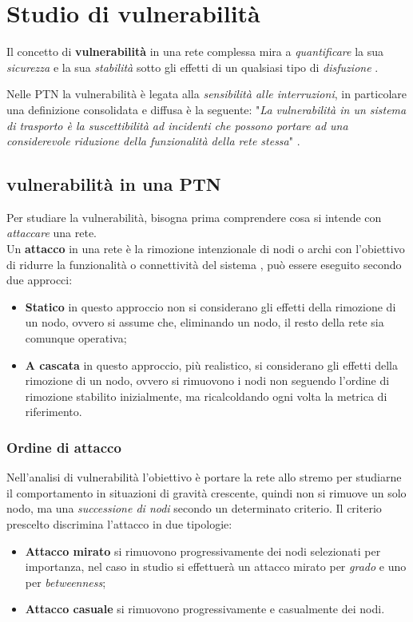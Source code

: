 \chapter{Studio di vulnerabilità}
\label{cap5}

Il concetto di \textbf{vulnerabilità} in una rete complessa mira a \textit{quantificare} la sua \textit{sicurezza} e la sua \textit{stabilità} sotto gli effetti di un qualsiasi tipo di \textit{disfuzione} \cite{MattssonJenelius2015}.

Nelle PTN la vulnerabilità è legata alla \textit{sensibilità alle interruzioni}, in particolare una definizione consolidata e diffusa è la seguente: "\textit{La vulnerabilità in un sistema di trasporto è la suscettibilità ad incidenti che possono portare ad una considerevole riduzione della funzionalità della rete stessa}" \cite{Berdica2002}. 

\section{vulnerabilità in una PTN}
Per studiare la vulnerabilità, bisogna prima comprendere cosa si intende con \textit{attaccare} una rete. \\
Un \textbf{attacco} in una rete è la rimozione intenzionale di nodi o archi con l’obiettivo di ridurre la funzionalità o connettività del sistema \cite{vonFerber2012LondonParis}, può essere eseguito secondo due approcci:
\begin{itemize}
    \item \textbf{Statico} in questo approccio non si considerano gli effetti della rimozione di un nodo, ovvero si assume che, eliminando un nodo, il resto della rete sia comunque operativa;
    \item \textbf{A cascata} in questo approccio, più realistico, si considerano gli effetti della rimozione di un nodo, ovvero si rimuovono i nodi non seguendo l'ordine di rimozione stabilito inizialmente, ma ricalcoldando ogni volta la metrica di riferimento.
\end{itemize}

\subsection{Ordine di attacco}
Nell'analisi di vulnerabilità l'obiettivo è portare la rete allo stremo per studiarne il comportamento in situazioni di gravità crescente, quindi non si rimuove un solo nodo, ma una \textit{successione di nodi} secondo un determinato criterio. Il criterio prescelto discrimina l'attacco in due tipologie:
\begin{itemize}
    \item \textbf{Attacco mirato} si rimuovono progressivamente dei nodi selezionati per importanza, nel caso in studio si effettuerà un attacco mirato per \textit{grado} e uno per \textit{betweenness};
    \item \textbf{Attacco casuale} si rimuovono progressivamente e casualmente dei nodi.
\end{itemize}

